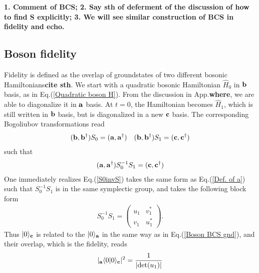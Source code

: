 {\bf\color{red} 1. Comment of BCS; 2. Say sth of deferment of the discussion of how to find S explicitly; 3. We will see similar construction of BCS in fidelity and echo.}

\subsection{Boson fidelity} 
\label{Boson fidelity}

Fidelity is defined as the overlap of groundstates of two different bosonic Hamiltonians{\bf\color{red}cite sth}. We start with a quadratic bosonic Hamiltonian $\hat{H}_0$ in ${\bf b}$ basis, as in Eq.(\ref{Quadratic boson H}). From the discussion in App.{\bf\color{red}where}, we are able to diagonalize it in ${\bf a}$ basis. At $t=0$, the Hamiltonian becomes $\hat{H}_1$, which is still written in ${\bf b}$ basis, but is diagonalized in a new ${\bf c}$ basis. The corresponding Bogoliubov transformations read
\begin{eqnarray}\begin{aligned}
\label{Two BdG}
({\bf b} , {\bf b}^\dagger)S_0=({\bf a} , {\bf a}^\dagger)\quad
({\bf b} , {\bf b}^\dagger)S_1=({\bf c} , {\bf c}^\dagger)
\end{aligned}\end{eqnarray}
such that
\begin{eqnarray}\begin{aligned}
\label{S0invS}
({\bf a} , {\bf a}^\dagger)S_0^{-1}S_1=({\bf c} , {\bf c}^\dagger)
\end{aligned}\end{eqnarray}
One immediately realizes Eq.(\ref{S0invS}) takes the same form as Eq.(\ref{Def. of a}) such that $S_0^{-1}S_1$ is in the same symplectic group, and takes the following block form
\begin{eqnarray}
S_0^{-1}S_1=\left(\begin{array}{ccc}
u_1 & v_1^*\\
v_1 & u_1^*
\end{array}\right).
\end{eqnarray}
Thus $|0\rangle_{\bf c}$ is related to the $|0\rangle_{{\bf a}}$ in the same way as in Eq.(\ref{Boson BCS gnd}), and their overlap, which is the fidelity, reads
\begin{eqnarray}\begin{aligned}
|_{\bf a}\langle0|0\rangle_{\bf c}|^2=\frac{1}{|\text{det}(u_1)|}
\end{aligned}\end{eqnarray}

